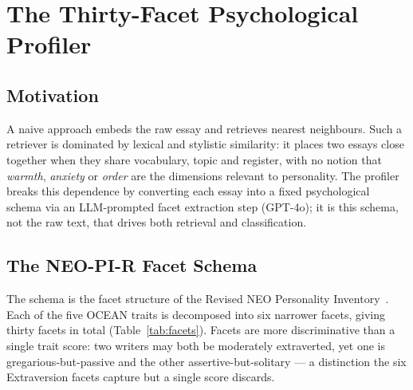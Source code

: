 \documentclass[../main.tex]{subfiles}
\begin{document}
\section{The Thirty-Facet Psychological Profiler}
\label{sec:profiler}

\subsection{Motivation}

A naive approach embeds the raw essay and retrieves nearest neighbours. Such a
retriever is dominated by lexical and stylistic similarity: it places two essays
close together when they share vocabulary, topic and register, with no notion
that \emph{warmth}, \emph{anxiety} or \emph{order} are the dimensions relevant
to personality. The profiler breaks this dependence by converting each essay
into a fixed psychological schema via an LLM-prompted facet extraction step
(GPT-4o); it is this schema, not the raw text, that drives both retrieval
and classification.

\subsection{The NEO-PI-R Facet Schema}
\label{subsec:neo-pi-r}

The schema is the facet structure of the Revised NEO Personality
Inventory~\cite{costa1992neo}. Each of the five OCEAN traits is decomposed into
six narrower facets, giving thirty facets in total (Table~\ref{tab:facets}).
Facets are more discriminative than a single trait score: two writers may both
be moderately extraverted, yet one is gregarious-but-passive and the other
assertive-but-solitary --- a distinction the six Extraversion facets capture but
a single score discards.
\end{document}
